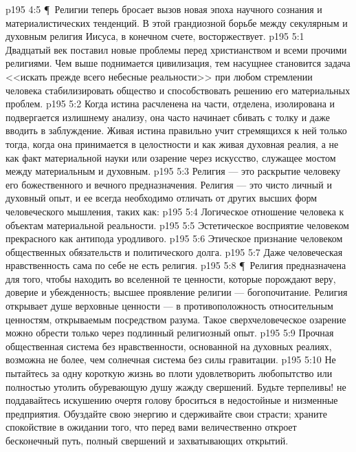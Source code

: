 \vs p195 4:5 \P\ Религии теперь бросает вызов новая эпоха научного сознания и материалистических тенденций. В этой грандиозной борьбе между секулярным и духовным религия Иисуса, в конечном счете, восторжествует.
\vs p195 5:1 Двадцатый век поставил новые проблемы перед христианством и всеми прочими религиями. Чем выше поднимается цивилизация, тем насущнее становится задача <<искать прежде всего небесные реальности>> при любом стремлении человека стабилизировать общество и способствовать решению его материальных проблем.
\vs p195 5:2 Когда истина расчленена на части, отделена, изолирована и подвергается излишнему анализу, она часто начинает сбивать с толку и даже вводить в заблуждение. Живая истина правильно учит стремящихся к ней только тогда, когда она принимается в целостности и как живая духовная реалия, а не как факт материальной науки или озарение через искусство, служащее мостом между материальным и духовным.
\vs p195 5:3 Религия --- это раскрытие человеку его божественного и вечного предназначения. Религия --- это чисто личный и духовный опыт, и ее всегда необходимо отличать от других высших форм человеческого мышления, таких как:
\vs p195 5:4 \bibnobreakspace Логическое отношение человека к объектам материальной реальности.
\vs p195 5:5 \bibnobreakspace Эстетическое восприятие человеком прекрасного как антипода уродливого.
\vs p195 5:6 \bibnobreakspace Этическое признание человеком общественных обязательств и политического долга.
\vs p195 5:7 \bibnobreakspace Даже человеческая нравственность сама по себе не есть религия.
\vs p195 5:8 \P\ Религия предназначена для того, чтобы находить во вселенной те ценности, которые порождают веру, доверие и убежденность; высшее проявление религии --- богопочитание. Религия открывает душе верховные ценности --- в противоположность относительным ценностям, открываемым посредством разума. Такое сверхчеловеческое озарение можно обрести только через подлинный религиозный опыт.
\vs p195 5:9 Прочная общественная система без нравственности, основанной на духовных реалиях, возможна не более, чем солнечная система без силы гравитации.
\vs p195 5:10 Не пытайтесь за одну короткую жизнь во плоти удовлетворить любопытство или полностью утолить обуревающую душу жажду свершений. Будьте терпеливы! не поддавайтесь искушению очертя голову броситься в недостойные и низменные предприятия. Обуздайте свою энергию и сдерживайте свои страсти; храните спокойствие в ожидании того, что перед вами величественно откроет бесконечный путь, полный свершений и захватывающих открытий.
